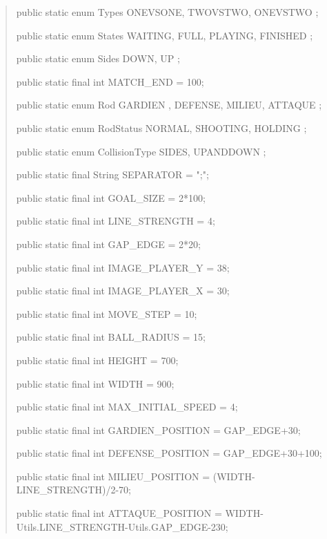 \documentclass[a4paper,12pt]{report}
\begin{document}
\begin{quote}
	public static enum Types { ONEVSONE, TWOVSTWO, ONEVSTWO };
	
	public static enum States { WAITING, FULL, PLAYING, FINISHED };  
	
	public static enum Sides { DOWN, UP };
	
	
	
	public static final int MATCH\_END = 100;
	
	
	
	public static enum Rod { GARDIEN , DEFENSE, MILIEU, ATTAQUE };
	
	public static enum RodStatus { NORMAL, SHOOTING, HOLDING };  
	
	
	
	public static enum CollisionType { SIDES, UPANDDOWN };
	
	
	
	public static final String SEPARATOR = ";";
	
	
	
	public static final int GOAL\_SIZE = 2*100;
	
	public static final int LINE\_STRENGTH = 4;
	
	public static final int GAP\_EDGE = 2*20;
	
	public static final int IMAGE\_PLAYER\_Y = 38;
	
	public static final int IMAGE\_PLAYER\_X = 30;
	
	public static final int MOVE\_STEP = 10;
	
	public static final int BALL\_RADIUS = 15;
	
	
	
	public static final int HEIGHT = 700;
	
	public static final int WIDTH = 900;



	public static final int MAX\_INITIAL\_SPEED = 4;

	

	public static final int GARDIEN\_POSITION = GAP\_EDGE+30;

	public static final int DEFENSE\_POSITION = GAP\_EDGE+30+100;

	public static final int MILIEU\_POSITION = (WIDTH-LINE\_STRENGTH)/2-70;

	public static final int ATTAQUE\_POSITION = WIDTH-Utils.LINE\_STRENGTH-Utils.GAP\_EDGE-230;
\end{quote}
\end{document}
